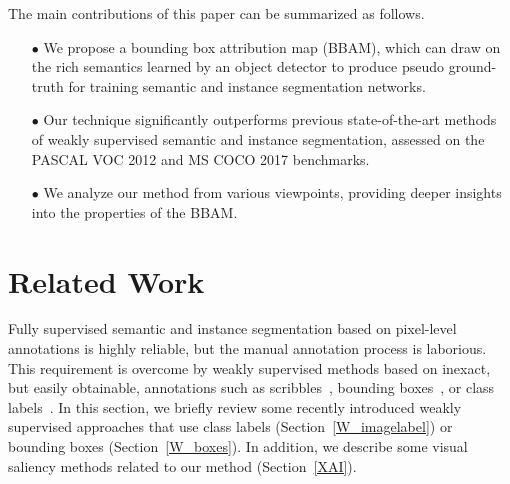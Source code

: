 \documentclass[final]{cvpr}
\begin{document}
The main contributions of this paper can be summarized as follows.
\begin{itemize}
\vspace{-4pt}
	\item[$\bullet$] We propose a bounding box attribution map (BBAM), which can draw on the rich semantics learned by an object detector to produce pseudo ground-truth for training semantic and instance segmentation networks.
	\vspace{-5pt}
	\item[$\bullet$] Our technique significantly outperforms previous state-of-the-art methods of weakly supervised semantic and instance segmentation, assessed on the PASCAL VOC 2012 and MS COCO 2017 benchmarks.
	\vspace{-5pt}
	\item[$\bullet$] We analyze our method from various viewpoints, providing deeper insights into the properties of the BBAM.
\end{itemize}


\section{Related Work}
Fully supervised semantic and instance segmentation based on pixel-level annotations is highly reliable, but the manual annotation process is laborious. This requirement is overcome by weakly supervised methods based on inexact, but easily obtainable, annotations such as scribbles~\cite{tang2018normalized}, bounding boxes~\cite{song2019box, khoreva2017simple}, or class labels~\cite{lee2019ficklenet, ahn2019weakly, sun2020mining}. In this section, we briefly review some recently introduced weakly supervised approaches that use class labels (Section~\ref{W_imagelabel}) or bounding boxes (Section~\ref{W_boxes}). In addition, we describe some visual saliency methods related to our method (Section~\ref{XAI}).
\end{document}
